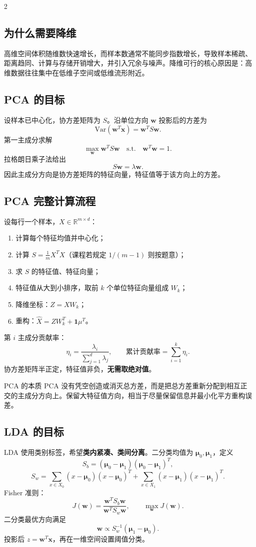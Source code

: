 \documentclass[9pt,a4paper,UTF8]{ctexart}
\newcommand{\R}{\mathbb{R}}
\begin{document}
\begin{multicols}{2}
\subsection{为什么需要降维}
高维空间体积随维数快速增长，而样本数通常不能同步指数增长，导致样本稀疏、距离趋同、计算与存储开销增大，并引入冗余与噪声。降维可行的核心原因是：高维数据往往集中在低维子空间或低维流形附近。

\subsection{PCA 的目标}
设样本已中心化，协方差矩阵为 $S$。沿单位方向 $\bm w$ 投影后的方差为
\[
\mathrm{Var}(\bm w^T\bm x)=\bm w^TS\bm w.
\]
第一主成分求解
\[
\max_{\bm w}\bm w^TS\bm w\quad\mathrm{s.t.}\quad \bm w^T\bm w=1.
\]
拉格朗日乘子法给出
\[
S\bm w=\lambda\bm w.
\]
因此主成分方向是协方差矩阵的特征向量，特征值等于该方向上的方差。

\subsection{PCA 完整计算流程}
设每行一个样本，$X\in\R^{m\times d}$：
\begin{enumerate}
\item 计算每个特征均值并中心化；
\item 计算 $S=\frac1mX^TX$（课程若规定 $1/(m-1)$ 则按题意）；
\item 求 $S$ 的特征值、特征向量；
\item 特征值从大到小排序，取前 $k$ 个单位特征向量组成 $W_k$；
\item 降维坐标：$Z=XW_k$；
\item 重构：$\hat X=ZW_k^T+\bm 1\mu^T$。
\end{enumerate}
第 $i$ 主成分贡献率：
\[
\eta_i=\frac{\lambda_i}{\sum_{j=1}^{d}\lambda_j},\qquad
\text{累计贡献率}=\sum_{i=1}^{k}\eta_i.
\]
协方差矩阵半正定，特征值非负，\textbf{无需取绝对值}。

\begin{keybox}{PCA 的本质}
PCA 没有凭空创造或消灭总方差，而是把总方差重新分配到相互正交的主成分方向上。保留大特征值方向，相当于尽量保留信息并最小化平方重构误差。
\end{keybox}

\subsection{LDA 的目标}
LDA 使用类别标签，希望\textbf{类内紧凑、类间分离}。二分类均值为 $\bm\mu_0,\bm\mu_1$，定义
\[
S_b=(\bm\mu_0-\bm\mu_1)(\bm\mu_0-\bm\mu_1)^T,
\]
\[
S_w=\sum_{x\in X_0}(x-\bm\mu_0)(x-\bm\mu_0)^T+
\sum_{x\in X_1}(x-\bm\mu_1)(x-\bm\mu_1)^T.
\]
Fisher 准则：
\[
J(\bm w)=\frac{\bm w^TS_b\bm w}{\bm w^TS_w\bm w},
\qquad \max_{\bm w}J(\bm w).
\]
二分类最优方向满足
\[
\bm w\propto S_w^{-1}(\bm\mu_1-\bm\mu_0).
\]
投影后 $z=\bm w^T\bm x$，再在一维空间设置阈值分类。


\end{multicols}
\end{document}
